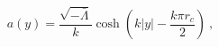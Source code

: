 \begin{equation} 
        a(y)=\frac{\sqrt{-\bar{\Lambda}}}{k}\cosh\left(k|y|-\frac{k\pi r_{c}}{2}\right)\ ,
        \end{equation} 
